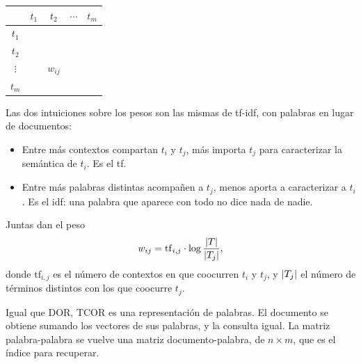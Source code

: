 \documentclass[11pt,letterpaper]{article}
\begin{document}
\begin{center}
\begin{tabular}{c|cccc}
             & $t_1$ & $t_2$ & $\cdots$ & $t_m$ \\
    \hline
    $t_1$    &       &          &       &       \\
    $t_2$    &       &          &       &       \\
    $\vdots$ &       & $w_{ij}$ &       &       \\
    $t_m$    &       &          &       &       \\
\end{tabular}
\end{center}

Las dos intuiciones sobre los pesos son las mismas de tf-idf, con
palabras en lugar de documentos:

\begin{itemize}[itemsep=0.3em]
    \item Entre más contextos compartan $t_i$ y $t_j$, más importa
          $t_j$ para caracterizar la semántica de $t_i$. Es el tf.
    \item Entre más palabras distintas acompañen a $t_j$, menos
          aporta a caracterizar a $t_i$. Es el idf: una palabra que
          aparece con todo no dice nada de nadie.
\end{itemize}

Juntas dan el peso
\[
    w_{ij} = \mathrm{tf}_{i,j} \cdot \log \frac{\left\lvert T \right\rvert}{\left\lvert T_j \right\rvert} ,
\]
donde $\mathrm{tf}_{i,j}$ es el número de contextos en que coocurren
$t_i$ y $t_j$, y $\left\lvert T_j \right\rvert$ el número de términos distintos con los
que coocurre $t_j$.

Igual que DOR, TCOR es una representación de palabras. El documento
se obtiene sumando los vectores de sus palabras, y la consulta igual.
La matriz palabra-palabra se vuelve una matriz documento-palabra, de
$n \times m$, que es el índice para recuperar.
\end{document}
